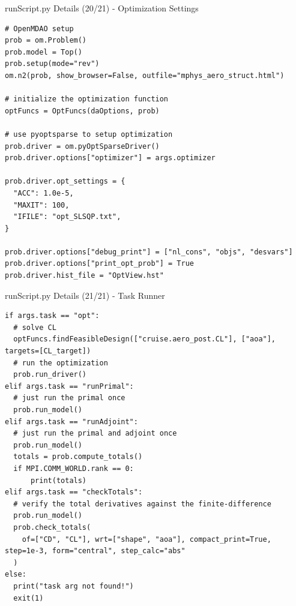 \documentclass{bredelebeamer}
\begin{document}
\begin{frame}[fragile]{runScript.py Details (20/21) - \large Optimization Settings}
\scriptsize
\lstset{ language=bash }
\begin{lstlisting}
# OpenMDAO setup
prob = om.Problem()
prob.model = Top()
prob.setup(mode="rev")
om.n2(prob, show_browser=False, outfile="mphys_aero_struct.html")

# initialize the optimization function
optFuncs = OptFuncs(daOptions, prob)

# use pyoptsparse to setup optimization
prob.driver = om.pyOptSparseDriver()
prob.driver.options["optimizer"] = args.optimizer

prob.driver.opt_settings = {
  "ACC": 1.0e-5,
  "MAXIT": 100,
  "IFILE": "opt_SLSQP.txt",
}

prob.driver.options["debug_print"] = ["nl_cons", "objs", "desvars"]
prob.driver.options["print_opt_prob"] = True
prob.driver.hist_file = "OptView.hst"

\end{lstlisting}
\normalsize
\end{frame}

\begin{frame}[fragile]{runScript.py Details (21/21) - \large Task Runner}
\scriptsize
\lstset{ language=bash }
\begin{lstlisting}
if args.task == "opt":
  # solve CL
  optFuncs.findFeasibleDesign(["cruise.aero_post.CL"], ["aoa"], targets=[CL_target])
  # run the optimization
  prob.run_driver()
elif args.task == "runPrimal":
  # just run the primal once
  prob.run_model()
elif args.task == "runAdjoint":
  # just run the primal and adjoint once
  prob.run_model()
  totals = prob.compute_totals()
  if MPI.COMM_WORLD.rank == 0:
      print(totals)
elif args.task == "checkTotals":
  # verify the total derivatives against the finite-difference
  prob.run_model()
  prob.check_totals(
    of=["CD", "CL"], wrt=["shape", "aoa"], compact_print=True, step=1e-3, form="central", step_calc="abs"
  )
else:
  print("task arg not found!")
  exit(1)
\end{lstlisting}
\normalsize
\end{frame}
\end{document}
